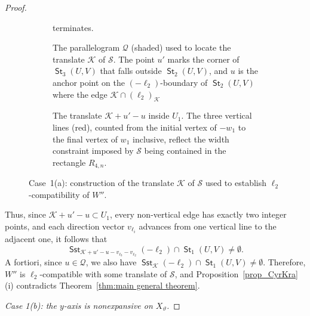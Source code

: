 \documentclass[12pt]{amsart}
\numberwithin{equation}{section}
\DeclareMathOperator{\st}{\mathsf{St}}
\DeclareMathOperator{\sst}{\mathsf{Sst}}
\begin{document}
\begin{proof}
\begin{figure}[ht]		
\centering		
    \begin{subfigure}{0.45\textwidth}
		\centering			
        \def\svgwidth{4.4cm}
		\caption{The parallelogram $\mathcal{Q}$ (shaded) used to locate the translate $\mathcal{K}$ of $\mathcal{S}$. The point $u'$ marks the corner of $\st_3(U,V)$ that falls outside $\st_2(U,V)$, and $u$ is the anchor point on the $(-\pmb{\ell}_2)$-boundary of $\st_2(U,V)$ where the edge $\mathcal{K} \cap (\pmb{\ell}_2)_{\mathcal{K}}$} terminates.
		\end{subfigure}
		\hfill
		\begin{subfigure}{0.45\textwidth}
		\centering
		\def\svgwidth{4.4cm}			
        \caption{The translate $\mathcal{K}+u'-u$ inside $U_1$. The three vertical lines (red), counted from the initial vertex of $-w_1$ to the final vertex of $w_1$ inclusive, reflect the width constraint imposed by $\mathcal S$ being contained in the rectangle $R_{4,n}$.}
		\end{subfigure}
		
	\caption{Case~1(a): construction of the translate $\mathcal{K}$ of
$\mathcal{S}$ used to establish $\pmb{\ell}_2$-compatibility of $W''$.}
	\label{fig5}	
\end{figure}

Thus, since $\mathcal{K}+u'-u \subset U_1$, every
non-vertical edge has exactly two integer points, and each direction
vector $v_{\pmb{\ell}_i}$ advances from one vertical line to the
adjacent one, it follows that
\[
\sst_{\mathcal{K}+u'-u-v_{\pmb{\ell}_3}
-v_{\pmb{\ell}_2}}(-\pmb{\ell}_2) \cap \st_1(U,V) \neq \emptyset.
\]
A fortiori, since $u \in \mathcal{Q}$, we also have
$\sst_{\mathcal{K}}(-\pmb{\ell}_2) \cap \st_1(U,V) \neq \emptyset$.
Therefore, $W''$ is $\pmb{\ell}_2$-compatible with some translate of $\mathcal{S}$, 
and Proposition~\ref{prop_CyrKra}(i) contradicts Theorem~\ref{thm:main general theorem}.

\medskip

\textit{Case 1(b): the $y$-axis is nonexpansive on $X_{\vartheta}$.}

\medskip


\end{proof}
\end{document}
